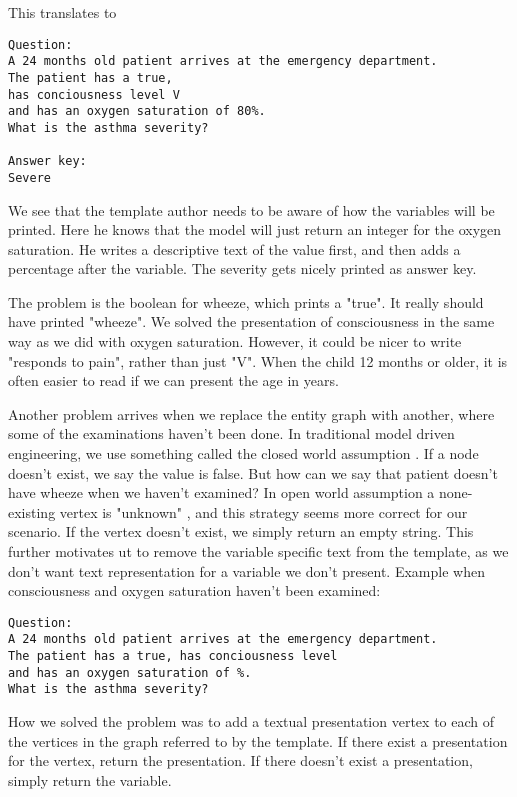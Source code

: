 This translates to 
\begin{verbatim}
Question:
A 24 months old patient arrives at the emergency department. 
The patient has a true,
has conciousness level V 
and has an oxygen saturation of 80%. 
What is the asthma severity? 

Answer key:
Severe
\end{verbatim}

We see that the template author needs to be aware of how the variables will be printed. Here he knows that the model will just return an integer for the oxygen saturation. He writes a descriptive text of the value first, and then adds a percentage after the variable. The severity gets nicely printed as answer key.

The problem is the boolean for wheeze, which prints a "true". It really should have printed "wheeze". We solved the presentation of consciousness in the same way as we did with oxygen saturation. However, it could be nicer to write "responds to pain", rather than just "V". When the child 12 months or older, it is often easier to read if we can present the age in years.

Another problem arrives when we replace the entity graph with another, where some of the examinations haven't been done. In traditional model driven engineering, we use something called the closed world assumption \parencite{Sadowska2019}. If a node doesn't exist, we say the value is false. But how can we say that patient doesn't have wheeze when we haven't examined? In open world assumption a none-existing vertex is "unknown" \parencite{Patel-Schneider2006} \parencite{Bergman2018}, and this strategy seems more correct for our scenario. If the vertex doesn't exist, we simply return an empty string. This further motivates ut to remove the variable specific text from the template, as we don't want text representation for a variable we don't present. Example when consciousness and oxygen saturation haven't been examined:

\begin{verbatim}
Question:
A 24 months old patient arrives at the emergency department. 
The patient has a true, has conciousness level 
and has an oxygen saturation of %. 
What is the asthma severity? 
\end{verbatim}

How we solved the problem was to add a textual presentation vertex to each of the vertices in the graph referred to by the template. If there exist a presentation for the vertex, return the presentation. If there doesn't exist a presentation, simply return the variable.

